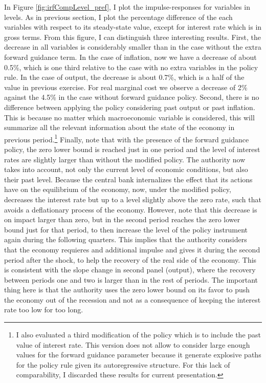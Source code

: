 \documentclass[12pt]{article}
\numberwithin{equation}{section}
\begin{document}
In Figure \ref{fig:irfCompLevel_pref}, I plot the impulse-responses for variables in levels. As in previous section, I plot the percentage difference of the each variables with respect to its steady-state value, except for interest rate which is in gross terms. From this figure, I can distinguish three interesting results. First, the decrease in all variables is considerably smaller than in the case without the extra forward guidance term. In the case of inflation, now we have a decrease of about 0.5\%, which is one third relative to the case with no extra variables in the policy rule. In the case of output, the decrease is about 0.7\%, which is a half of the value in previous exercise. For real marginal cost we observe a decrease of 2\% against the 4.5\% in the case without forward guidance policy. Second, there is no difference between applying the policy considering past output or past inflation. This is because no matter which macroeconomic variable is considered, this will summarize all the relevant information about the state of the economy in previous period.\footnote{I also evaluated a third modification of the policy which is to include the past value of interest rate. This version does not allow to consider large enough values for the forward guidance parameter because it generate explosive paths for the policy rule given its autoregressive structure. For this lack of comparability, I discarded these results for current presentation.} Finally, note that with the presence of the forward guidance policy, the zero lower bound is reached just in one period and the level of interest rates are slightly larger than without the modified policy. The authority now takes into account, not only the current level of economic conditions, but also their past level. Because the central bank internalizes the effect that its actions have on the equilibrium of the economy, now, under the modified policy, decreases the interest rate but up to a level slightly above the zero rate, such that avoids a deflationary process of the economy. However, note that this decrease is on impact larger than zero, but in the second period reaches the zero lower bound just for that period, to then increase the level of the policy instrument again during the following quarters. This implies that the authority considers that the economy requieres and additional impulse and gives it during the second period after the shock, to help the recovery of the real side of the economy. This is consistent with the slope change in second panel (output), where the recovery between periods one and two is larger than in the rest of periods. The important thing here is that the authority uses the zero lower bound on its favor to push the economy out of the recession and not as a consequence of keeping the interest rate too low for too long.
\end{document}

